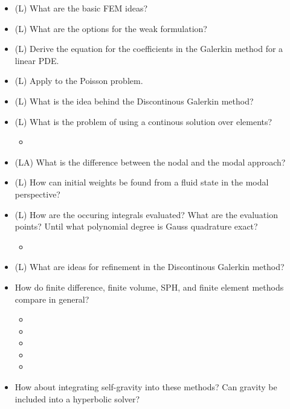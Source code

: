 \begin{itemize}
    \item (L) What are the basic FEM ideas?
    \item (L) What are the options for the weak formulation?
    \item (L) Derive the equation for the coefficients in the Galerkin method for a linear PDE.
    \item (L) Apply to the Poisson problem.
    \item (L) What is the idea behind the Discontinous Galerkin method?
    \item (L) What is the problem of using a continous solution over elements?
    \begin{itemize}
        \item {}
    \end{itemize}
    \item (LA) What is the difference between the nodal and the modal approach?
    \item (L) How can initial weights be found from a fluid state in the modal perspective?
    \item (L) How are the occuring integrals evaluated? What are the evaluation points? Until what polynomial
    degree is Gauss quadrature exact?
    \begin{itemize}
        \item {}
    \end{itemize}
    \item (L) What are ideas for refinement in the Discontinous Galerkin method?
\end{itemize}

\begin{itemize}
    \item How do finite difference, finite volume, SPH, and finite element methods compare in general?
    \begin{itemize}
        \item {}
        \item {}
        \item {}
        \item {}
        \item {}
    \end{itemize}
    \item How about integrating self-gravity into these methods? Can gravity be included into a hyperbolic solver?
\end{itemize}

